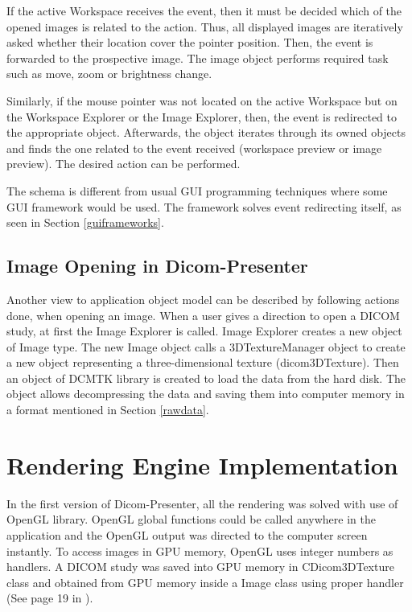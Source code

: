 If the active Workspace receives the event, then it must be decided which of the opened images is related to the action. Thus, all displayed images are iteratively asked whether their location cover the pointer position. Then, the event is forwarded to the prospective image. The image object performs required task such as move, zoom or brightness change.

Similarly, if the mouse pointer was not located on the active Workspace but on the Workspace Explorer or the Image Explorer, then, the event is redirected to the appropriate object. Afterwards, the object iterates through its owned objects and finds the one related to the event received (workspace preview or image preview). The desired action can be performed.

The schema is different from usual GUI programming techniques where some GUI framework would be used. The framework solves event redirecting itself, as seen in Section \ref{guiframeworks}.

\subsection{Image Opening in Dicom-Presenter}

Another view to application object model can be described by following actions done, when opening an image. When a user gives a direction to open a DICOM study, at first the Image Explorer is called. Image Explorer creates a new object of Image type. The new Image object calls a 3DTextureManager object to create a new object representing a three-dimensional texture (dicom3DTexture). Then an object of DCMTK library is created to load the data from the hard disk. The object allows decompressing the data and saving them into computer memory in a format mentioned in Section \ref{rawdata}.

\section{Rendering Engine Implementation}

In the first version of Dicom-Presenter, all the rendering was solved with use of OpenGL library. OpenGL global functions could be called anywhere in the application and the OpenGL output was directed to the computer screen instantly. To access images in GPU memory, OpenGL uses integer numbers as handlers. A DICOM study was saved into GPU memory in CDicom3DTexture class and obtained from GPU memory inside a Image class using proper handler (See page 19 in \cite{flaska_bc}).

